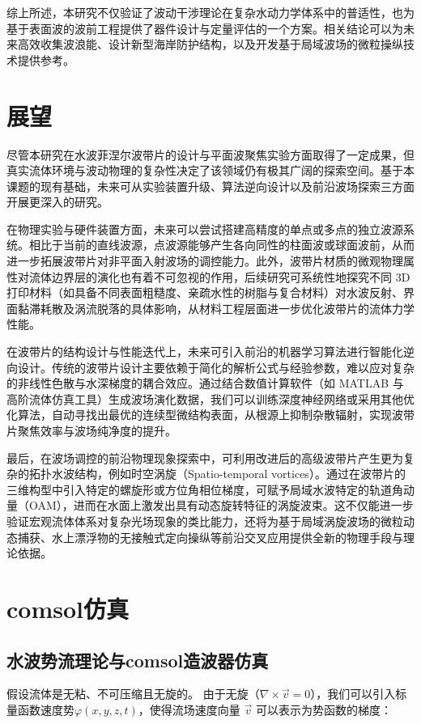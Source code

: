 \documentclass[11pt,a4paper]{ctexart}
\begin{document}
综上所述，本研究不仅验证了波动干涉理论在复杂水动力学体系中的普适性，也为基于表面波的波前工程提供了器件设计与定量评估的一个方案。相关结论可以为未来高效收集波浪能、设计新型海岸防护结构，以及开发基于局域波场的微粒操纵技术提供参考。


\section{展望}
尽管本研究在水波菲涅尔波带片的设计与平面波聚焦实验方面取得了一定成果，但真实流体环境与波动物理的复杂性决定了该领域仍有极其广阔的探索空间。基于本课题的现有基础，未来可从实验装置升级、算法逆向设计以及前沿波场探索三方面开展更深入的研究。

在物理实验与硬件装置方面，未来可以尝试搭建高精度的单点或多点的独立波源系统。相比于当前的直线波源，点波源能够产生各向同性的柱面波或球面波前，从而进一步拓展波带片对非平面入射波场的调控能力。此外，波带片材质的微观物理属性对流体边界层的演化也有着不可忽视的作用，后续研究可系统性地探究不同 3D 打印材料（如具备不同表面粗糙度、亲疏水性的树脂与复合材料）对水波反射、界面黏滞耗散及涡流脱落的具体影响，从材料工程层面进一步优化波带片的流体力学性能。

在波带片的结构设计与性能迭代上，未来可引入前沿的机器学习算法进行智能化逆向设计。传统的波带片设计主要依赖于简化的解析公式与经验参数，难以应对复杂的非线性色散与水深梯度的耦合效应。通过结合数值计算软件（如 MATLAB 与高阶流体仿真工具）生成波场演化数据，我们可以训练深度神经网络或采用其他优化算法，自动寻找出最优的连续型微结构表面，从根源上抑制杂散辐射，实现波带片聚焦效率与波场纯净度的提升。

最后，在波场调控的前沿物理现象探索中，可利用改进后的高级波带片产生更为复杂的拓扑水波结构，例如时空涡旋（Spatio-temporal vortices）。通过在波带片的三维构型中引入特定的螺旋形或方位角相位梯度，可赋予局域水波特定的轨道角动量（OAM），进而在水面上激发出具有动态旋转特征的涡旋波束\cite{Che2024STVP}。这不仅能进一步验证宏观流体体系对复杂光场现象的类比能力，还将为基于局域涡旋波场的微粒动态捕获、水上漂浮物的无接触式定向操纵等前沿交叉应用提供全新的物理手段与理论依据。

\newpage




\appendix
\section{comsol仿真}
\subsection{水波势流理论与comsol造波器仿真}
假设流体是无粘、不可压缩且无旋的。
由于无旋（$\nabla \times \vec{v} = 0$），我们可以引入标量函数速度势$\varphi(x,y,z,t)$，使得流场速度向量 $\vec{v}$ 可以表示为势函数的梯度：
\end{document}
